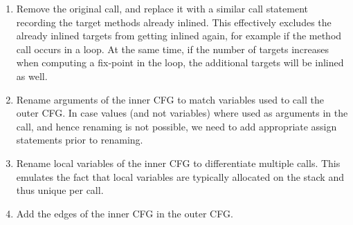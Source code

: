\documentclass[a4paper]{article}
\begin{document}
\begin{enumerate}
    \item Remove the original call, and replace it with a similar call
    statement recording the target methods already inlined. This effectively
    excludes the already inlined targets from getting inlined again, for
    example if the method call occurs in a loop. At the same time, if the
    number of targets increases when computing a fix-point in the loop, the
    additional targets will be inlined as well.

    \item Rename arguments of the inner CFG to match variables used to call the
    outer CFG. In case values (and not variables) where used as arguments in
    the call, and hence renaming is not possible, we need to add appropriate
    assign statements prior to renaming.

    \item Rename local variables of the inner CFG to differentiate multiple
    calls. This emulates the fact that local variables are typically allocated
    on the stack and thus unique per call.

    \item Add the edges of the inner CFG in the outer CFG.
\end{enumerate}
\end{document}
